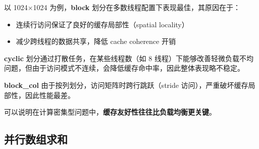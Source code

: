 \documentclass{SYSUReport}
\begin{document}
\begin{itemize}
    以 1024×1024 为例，\textbf{block} 划分在多数线程配置下表现最佳，其原因在于：
    \begin{itemize}
        \item 连续行访问保证了良好的缓存局部性（spatial locality）
        \item 减少跨线程的数据共享，降低 cache coherence 开销
    \end{itemize}

    \textbf{cyclic} 划分通过打散任务，在某些线程数（如 8 线程）下能够改善轻微负载不均问题，但由于访问模式不连续，会降低缓存命中率，因此整体表现略不稳定。

    \textbf{block\_col} 由于按列划分，访问矩阵时跨行跳跃（stride 访问），严重破坏缓存局部性，因此性能最差。

    可以说明在计算密集型问题中，\textbf{缓存友好性往往比负载均衡更关键}。
\end{itemize}

\subsection{并行数组求和}
\end{document}
